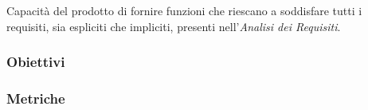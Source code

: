 Capacità del prodotto di fornire funzioni che riescano a soddisfare tutti i requisiti, sia espliciti
che impliciti, presenti nell’\textit{Analisi dei Requisiti}.

\subsubsection{Obiettivi}


\subsubsection{Metriche}



